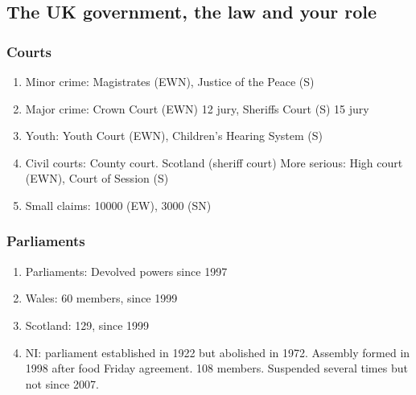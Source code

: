 \documentclass[10pt,reqno]{amsart}
\begin{document}

\subsection{The UK government, the law and your role}

\subsubsection{Courts}

\begin{enumerate}[i]
\item Minor crime: Magistrates (EWN), Justice of the Peace (S)
\item Major crime: Crown Court (EWN) 12 jury, Sheriffs Court (S) 15 jury
\item Youth: Youth Court (EWN), Children's Hearing System (S)
\item Civil courts:
County court. Scotland (sheriff court)
More serious: High court (EWN), Court of Session (S)
\item Small claims: 10000 (EW), 3000 (SN)
\end{enumerate}

\subsubsection{Parliaments}

\begin{enumerate}[i]
\item Parliaments: Devolved powers since 1997
\item Wales: 60 members, since 1999
\item Scotland: 129, since 1999
\item NI: parliament established in 1922 but abolished in 1972. Assembly formed in 1998 after food Friday agreement. 108 members. Suspended several times but not since 2007.
\end{enumerate}
\end{document}
